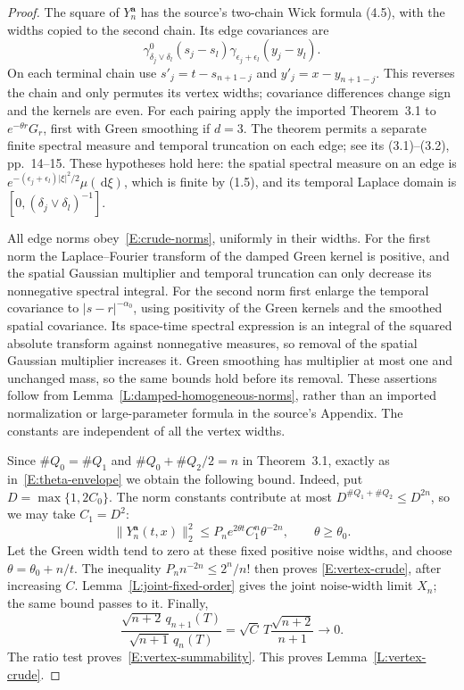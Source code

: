 \documentclass[12pt]{article}
\numberwithin{equation}{section}
\theoremstyle{definition}
\newcommand{\ud}{\,\mathrm{d}}
\begin{document}
\begin{proof}
  The square of $Y_n^{\boldsymbol a}$ has the source's two-chain Wick
  formula (4.5), with the widths copied to the second chain. Its edge
  covariances are
  \[
    \gamma^0_{\delta_j\vee\delta_l}(s_j-s_l)
    \gamma_{\epsilon_j+\epsilon_l}(y_j-y_l).
  \]
  On each terminal chain use
  $s'_j=t-s_{n+1-j}$ and $y'_j=x-y_{n+1-j}$.
  This reverses the chain and only permutes its vertex widths;
  covariance differences change sign and the kernels are even.
  For each pairing apply the imported Theorem~3.1 to
  $e^{-\theta r}G_r$, first with Green smoothing if
  $d=3$. The theorem permits a separate finite spectral measure and
  temporal truncation on each edge; see its (3.1)--(3.2), pp.~14--15.
  These hypotheses hold here: the spatial spectral measure on an edge
  is $e^{-(\epsilon_j+\epsilon_l)|\xi|^2/2}\mu(\ud\xi)$, which is
  finite by (1.5), and its temporal Laplace domain is
  $[0,(\delta_j\vee\delta_l)^{-1}]$.

  All edge norms obey~\eqref{E:crude-norms}, uniformly in their widths.
  For the first norm the Laplace--Fourier transform of the damped Green
  kernel is positive, and the spatial Gaussian multiplier and temporal
  truncation can only decrease its nonnegative spectral integral.
  For the second norm first enlarge the temporal covariance to
  $|s-r|^{-\alpha_0}$, using positivity of the Green kernels and the
  smoothed spatial covariance. Its space-time spectral expression is
  an integral of the squared absolute transform against nonnegative
  measures, so removal of the spatial Gaussian multiplier increases it.
  Green smoothing has multiplier at most one and unchanged mass,
  so the same bounds hold before its removal. These assertions follow
  from Lemma~\ref{L:damped-homogeneous-norms}, rather than an imported
  normalization or large-parameter formula in the source's Appendix.
  The constants are independent of all the vertex widths.

  Since $\#Q_0=\#Q_1$ and $\#Q_0+\#Q_2/2=n$ in Theorem~3.1,
  exactly as in~\eqref{E:theta-envelope} we obtain the following bound.
  Indeed, put $D=\max\{1,2C_0\}$. The norm constants contribute at
  most $D^{\#Q_1+\#Q_2}\le D^{2n}$, so we may take $C_1=D^2$:
  \[
    \|Y_n^{\boldsymbol a}(t,x)\|_2^2
    \le P_n e^{2\theta t}C_1^n\theta^{-2n},\qquad\theta\ge\theta_0.
  \]
  Let the Green width tend to zero at these fixed positive noise
  widths, and choose $\theta=\theta_0+n/t$.
  The inequality $P_n n^{-2n}\le2^n/n!$ then proves
  \eqref{E:vertex-crude}, after increasing $C$.
  Lemma~\ref{L:joint-fixed-order} gives the joint noise-width limit $X_n$;
  the same bound passes to it. Finally,
  \[
    \frac{\sqrt{n+2}\,q_{n+1}(T)}
    {\sqrt{n+1}\,q_n(T)}
    =\sqrt C\,T\frac{\sqrt{n+2}}{n+1}\longrightarrow0.
  \]
  The ratio test proves~\eqref{E:vertex-summability}.
  This proves Lemma~\ref{L:vertex-crude}.
\end{proof}
\end{document}
